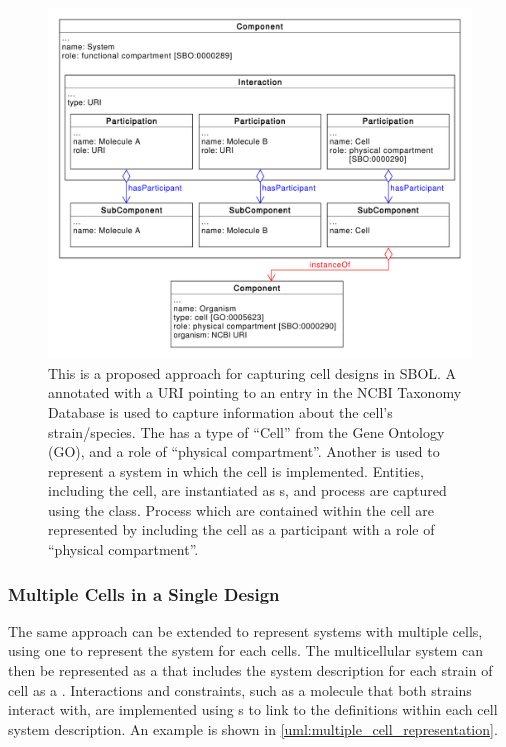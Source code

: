 \begin{figure}[ht]
	\begin{center}
		\includegraphics[width=\textwidth]{uml/cell_representation}
		\caption[Repressenting a cell]{This is a proposed approach for capturing cell designs in SBOL. A  annotated with a URI pointing to an entry in the NCBI Taxonomy Database is used to capture information about the cell's strain/species. 
		The  has a type of ``Cell'' from the Gene Ontology (GO), and a role of ``physical compartment''. 
		Another  is used to represent a system in which the cell is implemented. 
		Entities, including the cell, are instantiated as s, and process are captured using the  class.
		Process which are contained within the cell are represented by including the cell as a participant with a role of ``physical compartment''. }
		\label{uml:cell_representation}
	\end{center}
\end{figure}

\subsubsection{Multiple Cells in a Single Design}

The same approach can be extended to represent systems with multiple cells, using one  to represent the system for each cells.
The multicellular system can then be represented as a  that includes the system description for each strain of cell as a .
Interactions and constraints, such as a molecule that both strains interact with, are implemented using s to link to the definitions within each cell system description.
An example is shown in \ref{uml:multiple_cell_representation}.

